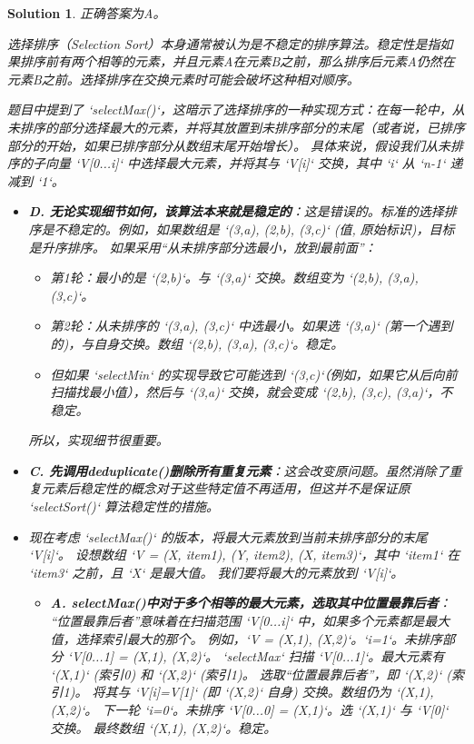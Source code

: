 \documentclass[UTF8]{report}
\newtheorem{solution}{Solution}
\theoremstyle{MyLineTheoremStyle} %
\theoremstyle{MyBlockTheoremStyle} %
\theoremstyle{MySubsubsectionStyle} %
\begin{document}
\begin{solution}
正确答案为A。

选择排序（Selection Sort）本身通常被认为是不稳定的排序算法。稳定性是指如果排序前有两个相等的元素，并且元素A在元素B之前，那么排序后元素A仍然在元素B之前。选择排序在交换元素时可能会破坏这种相对顺序。

题目中提到了 `selectMax()`，这暗示了选择排序的一种实现方式：在每一轮中，从未排序的部分选择最大的元素，并将其放置到未排序部分的末尾（或者说，已排序部分的开始，如果已排序部分从数组末尾开始增长）。
具体来说，假设我们从未排序的子向量 `V[0...i]` 中选择最大元素，并将其与 `V[i]` 交换，其中 `i` 从 `n-1` 递减到 `1`。

\begin{itemize}
    \item \textbf{D. 无论实现细节如何，该算法本来就是稳定的}：这是错误的。标准的选择排序是不稳定的。例如，如果数组是 `{(3,a), (2,b), (3,c)}` (值, 原始标识)，目标是升序排序。
    如果采用“从未排序部分选最小，放到最前面”：
    \begin{itemize}
        \item 第1轮：最小的是 `(2,b)`。与 `(3,a)` 交换。数组变为 `{(2,b), (3,a), (3,c)}`。
        \item 第2轮：从未排序的 `{(3,a), (3,c)}` 中选最小。如果选 `(3,a)` (第一个遇到的)，与自身交换。数组 `{(2,b), (3,a), (3,c)}`。稳定。
        \item 但如果 `selectMin` 的实现导致它可能选到 `(3,c)`（例如，如果它从后向前扫描找最小值），然后与 `(3,a)` 交换，就会变成 `{(2,b), (3,c), (3,a)}`，不稳定。
    \end{itemize}
    所以，实现细节很重要。

    \item \textbf{C. 先调用deduplicate()删除所有重复元素}：这会改变原问题。虽然消除了重复元素后稳定性的概念对于这些特定值不再适用，但这并不是保证原 `selectSort()` 算法稳定性的措施。

    \item 现在考虑 `selectMax()` 的版本，将最大元素放到当前未排序部分的末尾 `V[i]`。
    设想数组 `V = {(X, item1), (Y, item2), (X, item3)}`，其中 `item1` 在 `item3` 之前，且 `X` 是最大值。
    我们要将最大的元素放到 `V[i]`。
    \begin{itemize}
        \item \textbf{A. selectMax()中对于多个相等的最大元素，选取其中位置最靠后者}：
        “位置最靠后者”意味着在扫描范围 `V[0...i]` 中，如果多个元素都是最大值，选择索引最大的那个。
        例如，`V = {(X,1), (X,2)}`。`i=1`。未排序部分 `V[0...1] = {(X,1), (X,2)}`。
        `selectMax` 扫描 `V[0...1]`。最大元素有 `(X,1)` (索引0) 和 `(X,2)` (索引1)。
        选取“位置最靠后者”，即 `(X,2)` (索引1)。
        将其与 `V[i]=V[1]` (即 `(X,2)` 自身) 交换。数组仍为 `{(X,1), (X,2)}`。
        下一轮 `i=0`。未排序 `V[0...0] = {(X,1)}`。选 `(X,1)` 与 `V[0]` 交换。
        最终数组 `{(X,1), (X,2)}`。稳定。


\end{itemize}
\end{itemize}
\end{solution}
\end{document}

